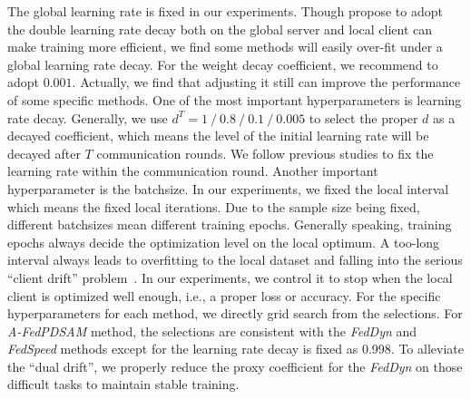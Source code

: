 The global learning rate is fixed in our experiments. Though \citet{asad2020fedopt} propose to adopt the double learning rate decay both on the global server and local client can make training more efficient, we find some methods will easily over-fit under a global learning rate decay. For the weight decay coefficient, we recommend to adopt $0.001$. Actually, we find that adjusting it still can improve the performance of some specific methods. One of the most important hyperparameters is learning rate decay. Generally, we use $d^T = 1\ /\ 0.8\ /\ 0.1\ /\ 0.005$ to select the proper $d$ as a decayed coefficient, which means the level of the initial learning rate will be decayed after $T$ communication rounds. We follow previous studies to fix the learning rate within the communication round. Another important hyperparameter is the batchsize. In our experiments, we fixed the local interval which means the fixed local iterations. Due to the sample size being fixed, different batchsizes mean different training epochs. Generally speaking, training epochs always decide the optimization level on the local optimum. A too-long interval always leads to overfitting to the local dataset and falling into the serious ``client drift'' problem~\citep{karimireddy2020scaffold}. In our experiments, we control it to stop when the local client is optimized well enough, i.e., a proper loss or accuracy. For the specific hyperparameters for each method, we directly grid search from the selections. For \textit{A-FedPDSAM} method, the selections are consistent with the \textit{FedDyn} and \textit{FedSpeed} methods except for the learning rate decay is fixed as 0.998. To alleviate the ``dual drift'', we properly reduce the proxy coefficient for the \textit{FedDyn} on those difficult tasks to maintain stable training.


